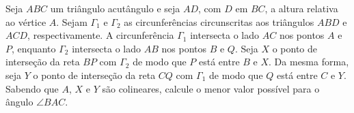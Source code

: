 Seja $ABC$ um triângulo acutângulo e seja $AD$, com $D$ em $BC$, a altura relativa ao vértice $A$. Sejam $\Gamma_1$ e $\Gamma_2$ as circunferências circunscritas aos triângulos $ABD$ e $ACD$, respectivamente.
A circunferência $\Gamma_1$ intersecta o lado $AC$ nos pontos $A$ e $P$, enquanto $\Gamma_2$ intersecta o lado $AB$ nos pontos $B$ e $Q$.
Seja $X$ o ponto de interseção da reta $BP$ com $\Gamma_2$ de modo que $P$ está entre $B$ e $X$.
Da mesma forma, seja $Y$ o ponto de interseção da reta $CQ$ com $\Gamma_1$ de modo que $Q$ está entre $C$ e $Y$. Sabendo que $A$, $X$ e $Y$ são colineares, calcule o menor valor possível para o ângulo $\angle BAC$.
